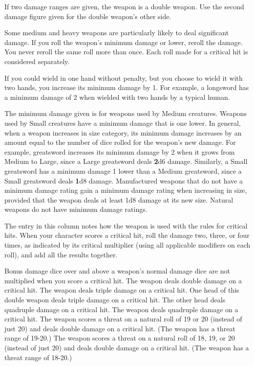 If two damage ranges are given, the weapon is a double weapon. Use the second damage figure given for the double weapon's other side.

 Some medium and heavy weapons are particularly likely to deal significant damage. If you roll the weapon's minimum damage or lower, reroll the damage. You never reroll the same roll more than once. Each roll made for a critical hit is considered separately.

If you could wield in one hand without penalty, but you choose to wield it with two hands, you increase its minimum damage by 1. For example, a longsword has a minimum damage of 2 when wielded with two hands by a typical human.

 The minimum damage given is for weapons used by Medium creatures. Weapons used by Small creatures have a minimum damage that is one lower. In general, when a weapon increases in size category, its minimum damage increases by an amount equal to the number of dice rolled for the weapon's new damage. For example, greatsword increases its minimum damage by 2 when it grows from Medium to Large, since a Large greatsword deals \textbf{2}d6 damage. Similarly, a Small greatsword has a minimum damage 1 lower than a Medium greatsword, since a Small greatsword deals \textbf{1}d8 damage. Manufactured weapons that do not have a minimum damage rating gain a minimum damage rating when increasing in size, provided that the weapon deals at least 1d8 damage at its new size. Natural weapons do not have minimum damage ratings.

 The entry in this column notes how the weapon is used with the rules for critical hits. When your character scores a critical hit, roll the damage two, three, or four times, as indicated by its critical multiplier (using all applicable modifiers on each roll), and add all the results together.

 Bonus damage dice over and above a weapon's normal damage dice are not multiplied when you score a critical hit.
 The weapon deals double damage on a critical hit.
 The weapon deals triple damage on a critical hit.
 One head of this double weapon deals triple damage on a critical hit. The other head deals quadruple damage on a critical hit.
 The weapon deals quadruple damage on a critical hit.
 The weapon scores a threat on a natural roll of 19 or 20 (instead of just 20) and deals double damage on a critical hit. (The weapon has a threat range of 19-20.)
 The weapon scores a threat on a natural roll of 18, 19, or 20 (instead of just 20) and deals double damage on a critical hit. (The weapon has a threat range of 18-20.)

